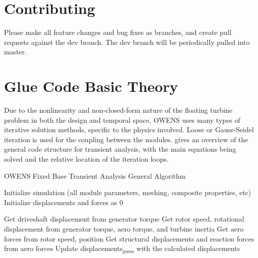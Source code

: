 \documentclass[11pt]{article}
\begin{document}

\vspace{12pt}

\section{Contributing}
Please make all feature changes and bug fixes as branches, and create pull requests against the dev branch.  The dev branch will be periodically pulled into master.

\section{Glue Code Basic Theory}

Due to the nonlinearity and non-closed-form nature of the floating turbine problem in both the design and temporal space, OWENS uses many types of iterative solution methods, specific to the physics involved.  Loose or Gauss-Seidel iteration is used for the coupling between the modules.   gives an overview of the general code structure for transient analysis, with the main equations being solved and the relative location of the iteration loops.

\begin{algorithm}
\caption{OWENS Fixed Base Transient Analysis General Algorithm}
\begin{spacing}{1.18}
\begin{algorithmic}[1]
\State Initialize simulation (all module parameters, meshing, composite properties, etc)
\State Initialize displacements and forces as 0


		\State Get driveshaft displacement from generator torque
		\State Get rotor speed, rotational displacement from generator torque, aero torque, and turbine inertia
		\State Get aero forces from rotor speed, position
		\State Get structural displacements and reaction forces from aero forces
		\State Update displacements$_\text{guess}$ with the calculated displacements
	\EndWhile
\EndFor

\end{algorithmic}
\end{spacing}
\label{alg:Transient}
\end{algorithm}
\end{document}
